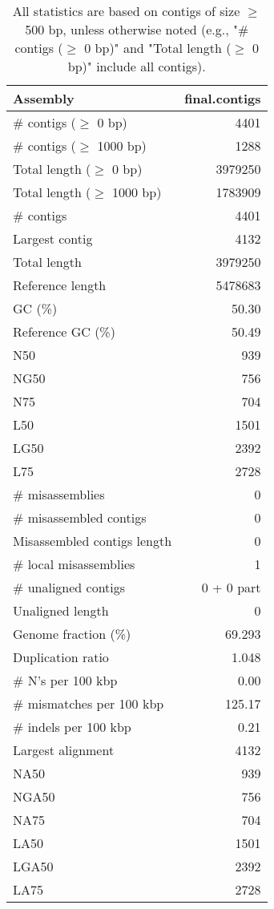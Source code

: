 \documentclass[12pt,a4paper]{article}
\begin{document}
\begin{table}[ht]
\begin{center}
\caption{All statistics are based on contigs of size $\geq$ 500 bp, unless otherwise noted (e.g., "\# contigs ($\geq$ 0 bp)" and "Total length ($\geq$ 0 bp)" include all contigs).}
\begin{tabular}{|l*{1}{|r}|}
\hline
Assembly & final.contigs \\ \hline
\# contigs ($\geq$ 0 bp) & 4401 \\ \hline
\# contigs ($\geq$ 1000 bp) & 1288 \\ \hline
Total length ($\geq$ 0 bp) & 3979250 \\ \hline
Total length ($\geq$ 1000 bp) & 1783909 \\ \hline
\# contigs & 4401 \\ \hline
Largest contig & 4132 \\ \hline
Total length & 3979250 \\ \hline
Reference length & 5478683 \\ \hline
GC (\%) & 50.30 \\ \hline
Reference GC (\%) & 50.49 \\ \hline
N50 & 939 \\ \hline
NG50 & 756 \\ \hline
N75 & 704 \\ \hline
L50 & 1501 \\ \hline
LG50 & 2392 \\ \hline
L75 & 2728 \\ \hline
\# misassemblies & 0 \\ \hline
\# misassembled contigs & 0 \\ \hline
Misassembled contigs length & 0 \\ \hline
\# local misassemblies & 1 \\ \hline
\# unaligned contigs & 0 + 0 part \\ \hline
Unaligned length & 0 \\ \hline
Genome fraction (\%) & 69.293 \\ \hline
Duplication ratio & 1.048 \\ \hline
\# N's per 100 kbp & 0.00 \\ \hline
\# mismatches per 100 kbp & 125.17 \\ \hline
\# indels per 100 kbp & 0.21 \\ \hline
Largest alignment & 4132 \\ \hline
NA50 & 939 \\ \hline
NGA50 & 756 \\ \hline
NA75 & 704 \\ \hline
LA50 & 1501 \\ \hline
LGA50 & 2392 \\ \hline
LA75 & 2728 \\ \hline
\end{tabular}
\end{center}
\end{table}
\end{document}
